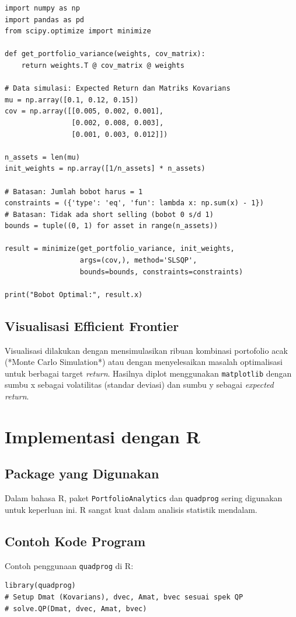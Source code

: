 \documentclass[12pt,a4paper]{book}
\begin{document}
\begin{verbatim}
import numpy as np
import pandas as pd
from scipy.optimize import minimize

def get_portfolio_variance(weights, cov_matrix):
    return weights.T @ cov_matrix @ weights

# Data simulasi: Expected Return dan Matriks Kovarians
mu = np.array([0.1, 0.12, 0.15])
cov = np.array([[0.005, 0.002, 0.001],
                [0.002, 0.008, 0.003],
                [0.001, 0.003, 0.012]])

n_assets = len(mu)
init_weights = np.array([1/n_assets] * n_assets)

# Batasan: Jumlah bobot harus = 1
constraints = ({'type': 'eq', 'fun': lambda x: np.sum(x) - 1})
# Batasan: Tidak ada short selling (bobot 0 s/d 1)
bounds = tuple((0, 1) for asset in range(n_assets))

result = minimize(get_portfolio_variance, init_weights, 
                  args=(cov,), method='SLSQP', 
                  bounds=bounds, constraints=constraints)

print("Bobot Optimal:", result.x)
\end{verbatim}

\subsection{Visualisasi Efficient Frontier}
Visualisasi dilakukan dengan mensimulasikan ribuan kombinasi portofolio acak (*Monte Carlo Simulation*) atau dengan menyelesaikan masalah optimalisasi untuk berbagai target \textit{return}. Hasilnya diplot menggunakan \texttt{matplotlib} dengan sumbu x sebagai volatilitas (standar deviasi) dan sumbu y sebagai \textit{expected return}.

\section{Implementasi dengan R}
\subsection{Package yang Digunakan}
Dalam bahasa R, paket \texttt{PortfolioAnalytics} dan \texttt{quadprog} sering digunakan untuk keperluan ini. R sangat kuat dalam analisis statistik mendalam.

\subsection{Contoh Kode Program}
Contoh penggunaan \texttt{quadprog} di R:
\begin{verbatim}
library(quadprog)
# Setup Dmat (Kovarians), dvec, Amat, bvec sesuai spek QP
# solve.QP(Dmat, dvec, Amat, bvec)
\end{verbatim}
\end{document}
